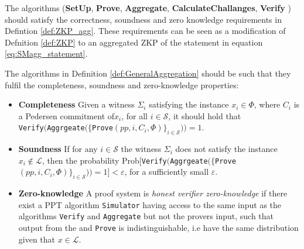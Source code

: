 \vspace{10pt}
The algorithms  (\textbf{SetUp}, \textbf{Prove}, \textbf{Aggregate}, \textbf{CalculateChallanges}, \textbf{Verify} ) should satisfy the correctness, soundness and zero knowledge requirements in Defintion \ref{def:ZKP_agg}. These requirements can be seen as a  modification of Defnition \ref{def:ZKP} to an aggregated ZKP of the statement in equation \eqref{eq:SMagg_statement}. 

\vspace{10pt}
\begin{Mydef}
\label{def:ZKP_agg}
The algorithms in Definition \ref{def:GeneralAggregation} should be such that they fulfil the completeness, soundness and zero-knowledge properties:
\begin{itemize}
\item \textbf{Completeness} Given a witness $\Sigma_i$ satisfying the instance $x_i\in\Phi$, where $C_i$ is a Pedersen commitment of$x_i$, for all $i\in\mathcal{S}$, it should hold that
\\
 \texttt{Verify}$($\texttt{Aggrgeate}$(\{$\texttt{Prove}$(pp,i,C_i,\Phi)\}_{i\in\mathcal{S}}) )= 1$. 
\item \textbf{Soundness} If for any $i\in\mathcal{S}$ the  witness $\Sigma_i$ does not satisfy the  instance $x_i\notin\mathcal{L}$, then the probability  Prob$[ $\texttt{Verify}$($\texttt{Aggrgeate}$(\{$\texttt{Prove}$(pp,i,C_i,\Phi)\}_{i\in\mathcal{S}}) ) = 1] < \varepsilon$, for a sufficiently small $\varepsilon$. 
\item  \textbf{Zero-knowledge} 
A proof system is \textit{honest verifier zero-knowledge} if there exist a PPT algorithm \texttt{Simulator} having access to the same input as the algorithms \texttt{Verify} and \texttt{Aggregate} but not the provers input, such that output from the  and \texttt{Prove} is indistinguishable, i.e have the same distribution given that $x\in\mathcal{L}$.  
\end{itemize}
\end{Mydef}

